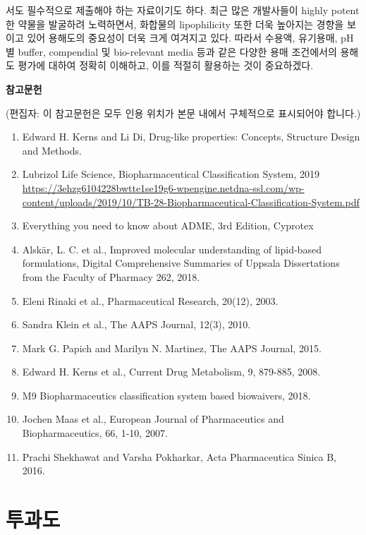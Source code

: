 \documentclass[
  11pt,
  krantz2, a4paper, twoside]{krantz}
\providecommand{\tightlist}{%
  \setlength{\itemsep}{0pt}\setlength{\parskip}{0pt}}
\begin{document}
서도 필수적으로 제출해야 하는 자료이기도 하다.
최근 많은 개발사들이 highly potent한 약물을 발굴하려 노력하면서, 화합물의 lipophilicity 또한 더욱 높아지는 경향을 보이고 있어 용해도의 중요성이 더욱 크게 여겨지고 있다.
따라서 수용액, 유기용매, pH별 buffer, compendial 및 bio-relevant media 등과 같은 다양한 용매 조건에서의 용해도 평가에 대하여 정확히 이해하고, 이를 적절히 활용하는 것이 중요하겠다.

\textbf{참고문헌}

(편집자: 이 참고문헌은 모두 인용 위치가 본문 내에서 구체적으로 표시되어야 합니다.)

\begin{enumerate}
\def\labelenumi{\arabic{enumi}.}
\tightlist
\item
  Edward H. Kerns and Li Di, Drug-like properties: Concepts, Structure Design and Methods.
\item
  Lubrizol Life Science, Biopharmaceutical Classification System, 2019 \url{https://3ehzg6104228bwtte1se19g6-wpengine.netdna-ssl.com/wp-content/uploads/2019/10/TB-28-Biopharmaceutical-Classification-System.pdf}
\item
  Everything you need to know about ADME, 3rd Edition, Cyprotex
\item
  Alskär, L. C. et al., Improved molecular understanding of lipid-based formulations, Digital Comprehensive Summaries of Uppsala Dissertations from the Faculty of Pharmacy 262, 2018.
\item
  Eleni Rinaki et al., Pharmaceutical Research, 20(12), 2003.
\item
  Sandra Klein et al., The AAPS Journal, 12(3), 2010.
\item
  Mark G. Papich and Marilyn N. Martinez, The AAPS Journal, 2015.
\item
  Edward H. Kerns et al., Current Drug Metabolism, 9, 879-885, 2008.
\item
  M9 Biopharmaceutics classification system based biowaivers, 2018.
\item
  Jochen Maas et al., European Journal of Pharmaceutics and Biopharmaceutics, 66, 1-10, 2007.
\item
  Prachi Shekhawat and Varsha Pokharkar, Acta Pharmaceutica Sinica B, 2016.
\end{enumerate}

\hypertarget{uxd22cuxacfcuxb3c4}{%
\chapter{투과도}\label{uxd22cuxacfcuxb3c4}}
\end{document}
